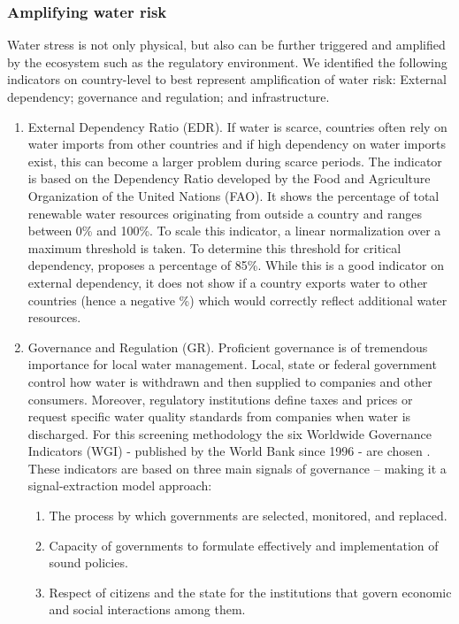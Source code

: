 \documentclass[a4paper]{article}
\begin{document}
\subsubsection{Amplifying water risk}
Water stress is not only physical, but also can be further triggered and amplified by the ecosystem such as the regulatory environment. 
We identified the following indicators on country-level to best represent amplification of water risk: External dependency; governance and regulation; and infrastructure.

\begin{enumerate}
	
	\item External Dependency Ratio (EDR).
If water is scarce, countries often rely on water imports from other countries and if high dependency on water imports exist, this can become a larger problem during scarce periods. 
The  indicator is based on the Dependency Ratio developed by the Food and Agriculture Organization of the United Nations (FAO). 
It shows the percentage of total renewable water resources originating from outside a country \citep{FAO:2016} and ranges between 0\% and 100\%. 
To scale this indicator, a linear normalization over a maximum threshold is taken. 
To determine this threshold for critical dependency, \citet{Diop:2002} proposes a percentage of 85\%. 
While this is a good indicator on external dependency, it does not show if a country exports water to other countries (hence a negative \%) which would correctly reflect additional water resources.
	
	\item Governance and Regulation (GR).
Proficient governance is of tremendous importance for local water management. 
Local, state or federal government control how water is withdrawn and then supplied to companies and other consumers. 
Moreover, regulatory institutions define taxes and prices or request specific water quality standards from companies when water is discharged. 
For this screening methodology the six Worldwide Governance Indicators (WGI) - published by the World Bank since 1996 - are chosen \citep{Kaufmann:2011}.
These indicators are based on three main signals of governance – making it a signal-extraction model approach:

	\begin{enumerate}
		\item The process by which governments are selected, monitored, and replaced.
		\item Capacity of governments to formulate effectively and implementation of sound policies.
		\item Respect of citizens and the state for the institutions that govern economic and social interactions among them.
	\end{enumerate}


\end{enumerate}
\end{document}
